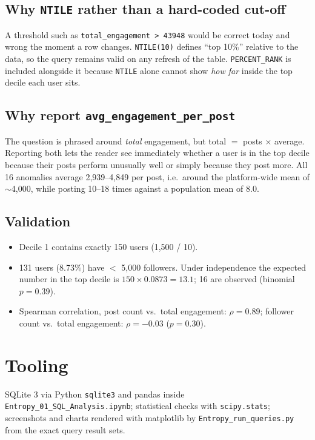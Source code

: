 \documentclass[11pt,a4paper]{article}
\begin{document}
\subsection{Why \texttt{NTILE} rather than a hard-coded cut-off}
A threshold such as \texttt{total\_engagement > 43948} would be correct today and wrong the moment a row changes. \texttt{NTILE(10)} defines ``top 10\%'' relative to the data, so the query remains valid on any refresh of the table. \texttt{PERCENT\_RANK} is included alongside it because \texttt{NTILE} alone cannot show \emph{how far} inside the top decile each user sits.

\subsection{Why report \texttt{avg\_engagement\_per\_post}}
The question is phrased around \emph{total} engagement, but total $=$ posts $\times$ average. Reporting both lets the reader see immediately whether a user is in the top decile because their posts perform unusually well or simply because they post more. All 16 anomalies average 2,939--4,849 per post, i.e.\ around the platform-wide mean of $\sim$4,000, while posting 10--18 times against a population mean of 8.0.

\subsection{Validation}
\begin{itemize}[leftmargin=*]
  \item Decile 1 contains exactly 150 users (1,500 / 10).
  \item 131 users (8.73\%) have $<$ 5,000 followers. Under independence the expected number in the top decile is $150 \times 0.0873 = 13.1$; 16 are observed (binomial $p = 0.39$).
  \item Spearman correlation, post count vs.\ total engagement: $\rho = 0.89$; follower count vs.\ total engagement: $\rho = -0.03$ ($p = 0.30$).
\end{itemize}

\section{Tooling}

SQLite 3 via Python \texttt{sqlite3} and pandas inside \texttt{Entropy\_01\_SQL\_Analysis.ipynb}; statistical checks with \texttt{scipy.stats}; screenshots and charts rendered with matplotlib by \texttt{Entropy\_run\_queries.py} from the exact query result sets.
\end{document}
